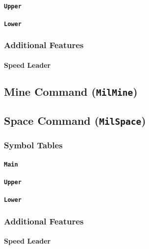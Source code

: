 \documentclass[a4paper, titlepage]{article}
\begin{document}
\paragraph{\texttt{Upper}}

\paragraph{\texttt{Lower}}

\subsubsection{Additional Features}

\paragraph{Speed Leader}

\subsection{Mine Command (\textbf{\texttt{MilMine}})}

\subsection{Space Command (\textbf{\texttt{MilSpace}})}

\subsubsection{Symbol Tables}

\paragraph{\texttt{Main}}

\paragraph{\texttt{Upper}}

\paragraph{\texttt{Lower}}

\subsubsection{Additional Features}

\paragraph{Speed Leader}
\end{document}
